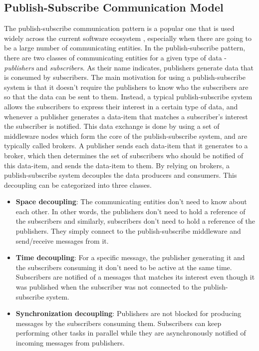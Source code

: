 \subsection{Publish-Subscribe Communication Model}
The publish-subscribe communication pattern is a popular one that is used widely across the current software ecosystem \cite{}, especially when there are going to be a large number of communicating entities. In the publish-subscribe pattern, there are two classes of communicating entities for a given type of data - \textit{publishers} and \textit{subscribers}. As their name indicates, publishers generate data that is consumed by subscribers. The main motivation for using a publish-subscribe system is that it doesn't require the publishers to know who the subscribers are so that the data can be sent to them. Instead, a typical publish-subscribe system allows the subscribers to express their interest in a certain type of data, and whenever a publisher generates a data-item that matches a subscriber's interest the subscriber is notified. This data exchange is done by using a set of middleware nodes which form the core of the publish-subscribe system, and are typically called brokers. A publisher sends each data-item that it generates to a broker, which then determines the set of subscribers who should be notified of this data-item, and sends the data-item to them. By relying on brokers, a publish-subscribe system decouples the data producers and consumers. This decoupling can be categorized into three classes.
\begin{itemize}
\item \textbf{Space decoupling}: The communicating entities don't need to know about each other. In other words, the publishers don't need to hold a reference of the subscribers and similarly, subscribers don't need to hold a reference of the publishers. They simply connect to the publish-subscribe middleware and send/receive messages from it.
\item \textbf{Time decoupling}: For a specific message, the publisher generating it and the subscribers consuming it don't need to be active at the same time. Subscribers are notified of a messages that matches its interest even though it was published when the subscriber was not connected to the publish-subscribe system.
\item \textbf{Synchronization decoupling}: Publishers are not blocked for producing messages by the subscribers consuming them. Subscribers can keep performing other tasks in parallel while they are asynchronously notified of incoming messages from publishers. 
\end{itemize}
